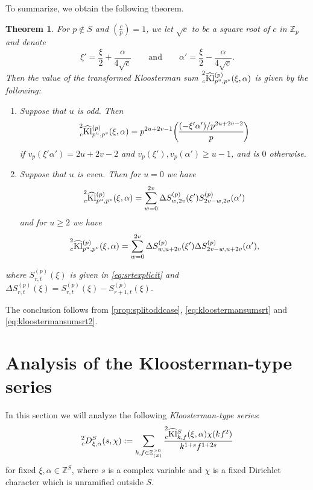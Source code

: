 \documentclass[10pt,oneside,reqno]{amsart}
\makeatletter
\newcommand\ZZ{\mathbb{Z}}
\newcommand\Kl{\mathrm{Kl}}
\renewcommand\geq{\geqslant}
\newcommand\legendresymbol[2]{\genfrac{(}{)}{}{}{#1}{#2}}
\theoremstyle{THEOREM}
\newtheorem{theorem}{Theorem}[section]
\theoremstyle{DEFINITION}
\theoremstyle{EXERCISE}
\numberwithin{equation}{section}
\renewenvironment{proof}[1][\proofname]{\par
  \vspace{-6pt}
  \pushQED{\qed}
  \normalfont \topsep6\p@\@plus6\p@\relax
  \trivlist
  \item[\hskip\labelsep\rmfamily\bfseries
    #1\@addpunct{:}]\ignorespaces
}{
  \popQED\endtrivlist\@endpefalse
  \vspace{-6pt}
}
\makeatother
\begin{document}
To summarize, we obtain the following theorem.
\begin{theorem}\label{thm:localkloostermansplit}
For $p\notin S$ and $\legendresymbol{c}{p}=1$, we let $\sqrt{c}$ to be a square root of $c$ in $\ZZ_p$ and denote
\[
\xi'=\frac{\xi}{2}+\frac{\alpha}{4\sqrt{c}}\qquad\text{and}\qquad \alpha'=\frac{\xi}{2}-\frac{\alpha}{4\sqrt{c}}.
\]
Then the value of the transformed Kloosterman sum $\prescript{2}{c}{\widehat{\Kl}}_{p^u,p^v}^{(p)}(\xi,\alpha)$ is given by the following:
\begin{enumerate}[itemsep=0pt,parsep=0pt,topsep=0pt, leftmargin=0pt,labelsep=2.5pt,itemindent=15pt,label=\upshape{(\arabic*)}]
  \item Suppose that $u$ is odd. Then 
  \[
  \prescript{2}{c}{\widehat{\Kl}}_{p^u,p^v}^{(p)}(\xi,\alpha)=p^{2u+2v-1} \legendresymbol{(-\xi'\alpha')/p^{2u+2v-2}}{p}
  \]
  if $v_p(\xi'\alpha')=2u+2v-2$ and $v_p(\xi'),v_p(\alpha')\geq u-1$, and is $0$ otherwise.
\item Suppose that $u$ is even. Then for $u=0$ we have
      \[
      \prescript{2}{c}{\widehat{\Kl}}_{p^u,p^v}^{(p)}(\xi,\alpha)=\sum_{w=0}^{2v}\Delta S_{w,2v}^{(p)}(\xi')S_{2v-w,2v}^{(p)}(\alpha')
      \]
      and for $u\geq 2$ we have
      \[
      \prescript{2}{c}{\widehat{\Kl}}_{p^u,p^v}^{(p)}(\xi,\alpha)=\sum_{w=0}^{2v}\Delta S_{w,u+2v}^{(p)}(\xi')\Delta S_{2v-w,u+2v}^{(p)}(\alpha'),
      \]
\end{enumerate}
where $S_{r,t}^{(p)}(\xi)$ is given in \eqref{eq:srtexplicit} and $\Delta S_{r,t}^{(p)}(\xi)=S_{r,t}^{(p)}(\xi)-S_{r+1,t}^{(p)}(\xi)$.
\end{theorem}
\begin{proof}
The conclusion follows from \autoref{prop:splitoddcase}, \eqref{eq:kloostermansumsrt} and \eqref{eq:kloostermansumsrt2}.
\end{proof}

\section{Analysis of the Kloosterman-type series}
In this section we will analyze the following \emph{Kloosterman-type series}:
\begin{equation}\label{eq:kloostermantypeseries}
\prescript{2}{c}D_{\xi,\alpha}^S(s,\chi):=\sum_{k,f\in \ZZ_{(S)}^{>0}}\frac{\prescript{2}{c}{\widehat{\Kl}}_{k,f}^{S}(\xi,\alpha)\chi(kf^2)}{k^{1+s}f^{1+2s}}
\end{equation}
for fixed $\xi,\alpha\in \ZZ^{S}$, where $s$ is a complex variable and $\chi$ is a fixed Dirichlet character which is unramified outside $S$.
\end{document}
